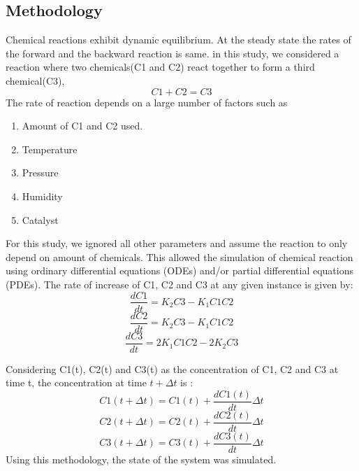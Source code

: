 \documentclass[10pt,journal,cspaper,compsoc]{IEEEtran}
\begin{document}
  \subsection{Methodology}
  Chemical reactions exhibit dynamic equilibrium. At the steady state the rates of the forward and the backward reaction is same.
  in this study, we considered a reaction where two chemicals(C1 and C2) react together to form a third chemical(C3),
  \begin{equation}
    C1 + C2 = C3
  \end{equation} 
  The rate of reaction depends on a large number of factors such as 
  \begin{enumerate}
    \item Amount of C1 and C2 used.
    \item Temperature
    \item Pressure
    \item Humidity
    \item Catalyst
  \end{enumerate}
  For this study, we ignored all other parameters and assume the reaction to only depend on amount of chemicals.
  This allowed the simulation of chemical reaction using ordinary differential equations (ODEs) and/or partial differential equations (PDEs).
  The rate of increase of C1, C2 and C3 at any given instance is given by:
  \begin{equation}
    \frac{dC1}{dt} = K_{2} C3 - K_{1} C1 C2 
  \end{equation}
\begin{equation}
  \frac{dC2}{dt} = K_{2} C3 - K_{1} C1 C2
\end{equation}
\begin{equation}
  \frac{dC3}{dt} = 2 K_{1} C1 C2 - 2 K_{2} C3
\end{equation}

Considering C1(t), C2(t) and C3(t) as the concentration of C1, C2 and C3 at time t, the concentration at time 
\begin{math}
  t + \Delta t
\end{math}
is :
\begin{equation}
  C1(t+\Delta t) = C1(t) + \frac{dC1(t)}{dt} \Delta t
\end{equation} 
\begin{equation}
  C2(t+\Delta t) = C2(t) + \frac{dC2(t)}{dt} \Delta t
\end{equation}
\begin{equation}
  C3(t+\Delta t) = C3(t) + \frac{dC3(t)}{dt} \Delta t
\end{equation}
Using this methodology, the state of the system was simulated.
\end{document}
